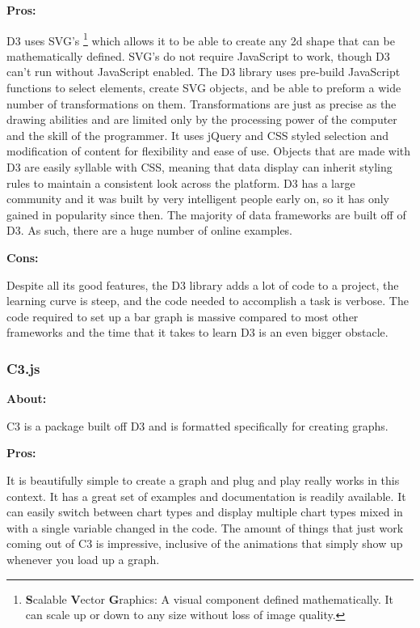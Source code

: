 \documentclass[draftclsnofoot,onecolumn,letterpaper,10pt,compsoc]{IEEEtran}
\begin{document}
    \noindent \textbf{Pros:}

    D3 uses SVG's \footnote{\textbf{S}calable \textbf{V}ector \textbf{G}raphics: A visual component defined mathematically. It can scale up or down to any size without loss of image quality.} which allows it to be able to create any 2d shape that can be mathematically defined.
    SVG's do not require JavaScript to work, though D3 can't run without JavaScript enabled.
    The D3 library uses pre-build JavaScript functions to select elements, create SVG objects, and be able to preform a wide number of transformations on them.\cite{d3.org}
    Transformations are just as precise as the drawing abilities and are limited only by the processing power of the computer and the skill of the programmer.
    It uses jQuery and CSS styled selection and modification of content for flexibility and ease of use.
    Objects that are made with D3 are easily syllable with CSS, meaning that data display can inherit styling rules to maintain a consistent look across the platform.
    D3 has a large community and it was built by very intelligent people early on, so it has only gained in popularity since then.\cite{DataVisProCon}
    The majority of data frameworks are built off of D3.
    As such, there are a huge number of online examples.

    \noindent \textbf{Cons:}

    Despite all its good features, the D3 library adds a lot of code to a project, the learning curve is steep, and the code needed to accomplish a task is verbose.\cite{DataVisProCon}
    The code required to set up a bar graph is massive compared to most other frameworks and the time that it takes to learn D3 is an even bigger obstacle.

    \subsubsection{C3.js}
    \textbf{About:}

    C3 is a package built off D3 and is formatted specifically for creating graphs.

    \noindent \textbf{Pros:}

    It is beautifully simple to create a graph and plug and play really works in this context.
    It has a great set of examples and documentation is readily available.
    It can easily switch between chart types and display multiple chart types mixed in with a single variable changed in the code.\cite{c3.org}
    The amount of things that just work coming out of C3 is impressive, inclusive of the animations that simply show up whenever you load up a graph.
\end{document}
